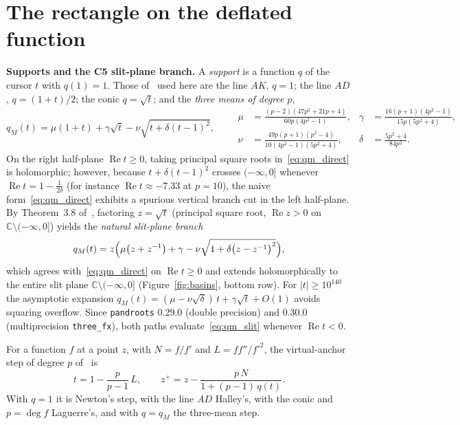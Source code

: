 \documentclass[10pt,a4paper]{article}
\theoremstyle{definition}
\numberwithin{equation}{section}
\newcommand{\C}{\mathbb{C}}
\begin{document}
\section{The rectangle on the deflated function}\label{sec:step}
\textbf{Supports and the C5 slit-plane branch.}
A \emph{support} is a function $q$ of the cursor $t$ with $q(1)=1$. Those of~\cite{v31} used here are the line $AK$, $q=1$; the line $AD$, $q=(1+t)/2$; the conic $q=\sqrt t$; and the \emph{three means of degree $p$},
\begin{equation}\label{eq:qm_direct}
 q_M(t)=\mu(1+t)+\gamma\sqrt t-\nu\sqrt{t+\delta(t-1)^2},\qquad
 \begin{aligned}
 \mu&=\tfrac{(p-2)(47p^2+21p+4)}{60p(4p^2-1)}, & \gamma&=\tfrac{16(p+1)(4p^2-1)}{15p(5p^2+4)},\\
 \nu&=\tfrac{49p(p+1)(p^2-4)}{10(4p^2-1)(5p^2+4)}, & \delta&=\tfrac{5p^2+4}{84p^2}.
 \end{aligned}
\end{equation}
On the right half-plane $\operatorname{Re} t\ge 0$, taking principal square roots in~\eqref{eq:qm_direct} is holomorphic; however, because $t+\delta(t-1)^2$ crosses $(-\infty,0]$ whenever $\operatorname{Re} t = 1 - \frac{1}{2\delta}$ (for instance $\operatorname{Re} t \approx -7.33$ at $p=10$), the naive form~\eqref{eq:qm_direct} exhibits a spurious vertical branch cut in the left half-plane. By Theorem~3.8 of~\cite{c5}, factoring $z=\sqrt{t}$ (principal square root, $\operatorname{Re} z>0$ on $\C\setminus(-\infty,0]$) yields the \emph{natural slit-plane branch}
\begin{equation}\label{eq:qm_slit}
 q_M(t)=z\Bigl(\mu\bigl(z+z^{-1}\bigr)+\gamma-\nu\sqrt{1+\delta\bigl(z-z^{-1}\bigr)^2}\Bigr),
\end{equation}
which agrees with~\eqref{eq:qm_direct} on $\operatorname{Re} t\ge 0$ and extends holomorphically to the entire slit plane $\C\setminus(-\infty,0]$ (Figure~\ref{fig:basins}, bottom row). For $|t|\ge 10^{140}$ the asymptotic expansion $q_M(t)=(\mu-\nu\sqrt{\delta})\,t+\gamma\sqrt{t}+O(1)$ avoids squaring overflow. Since \texttt{pandroots} 0.29.0 (double precision) and 0.30.0 (multiprecision \texttt{three\_fx}), both paths evaluate~\eqref{eq:qm_slit} whenever $\operatorname{Re} t<0$.

For a function $f$ at a point $z$, with $N=f/f'$ and $L=ff''/f'^2$, the virtual-anchor step of degree $p$ of~\cite{g2} is
\begin{equation}\label{eq:g2}
 t=1-\frac{p}{p-1}\,L,\qquad z^+=z-\frac{p\,N}{1+(p-1)\,q(t)} .
\end{equation}
With $q=1$ it is Newton's step, with the line $AD$ Halley's, with the conic and $p=\deg f$ Laguerre's, and with $q=q_M$ the three-mean step.
\end{document}
